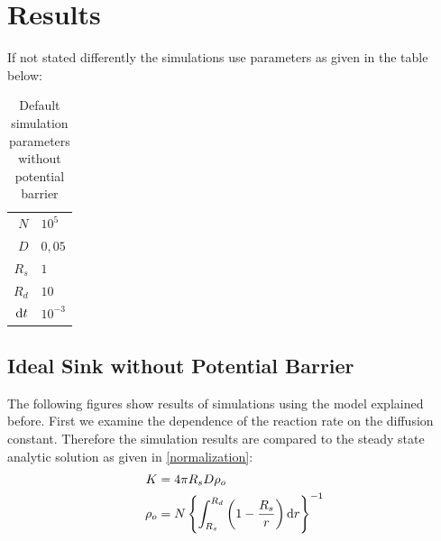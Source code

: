 \section{Results}
If not stated differently the simulations use parameters as given in the table below:
\begin{table}[H]
    \centering
    \begin{tabular}{r|l}
        $N$ & $10^{5}$\\
        $D$ & $0,05$\\
        $R_s$ & $1$ \\
        $R_d$ & $10$ \\
        ${\rm d}t$ & $10^{-3}$
    \end{tabular}
    \caption{Default simulation parameters without potential barrier}
    \label{tab:Parameters_np}
\end{table}

\subsection{Ideal Sink without Potential Barrier}
The following figures show results of simulations using the model explained before. First we examine the dependence of the reaction rate on the diffusion constant. Therefore the simulation results are compared to the steady state analytic solution as given in \eqref{normalization}:
\begin{align}
    K &= 4 \pi R_s D \rho_o \\
    \rho_o &= N \left\{ \int_{R_s}^{R_d} \left( 1 - \frac{R_s}{r} \right) {\rm d} r \right\}^{-1}
    \label{Steady_state_rate}
\end{align}
\newpage
